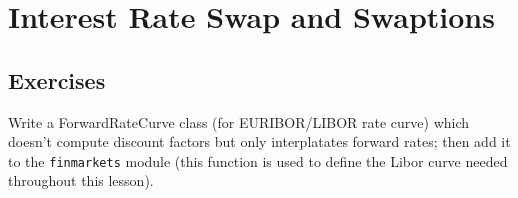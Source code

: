 \chapter{Interest Rate Swap and Swaptions}\label{introduction-to-python---lesson-8}

\section{Exercises}

\begin{Exercise}[title={(Forward rate curve class)}]
Write a ForwardRateCurve class (for EURIBOR/LIBOR rate curve) which
doesn't compute discount factors but only interplatates forward rates;
then add it to the \texttt{finmarkets} module (this function is used to
define the Libor curve needed throughout this lesson).
\end{Exercise}
